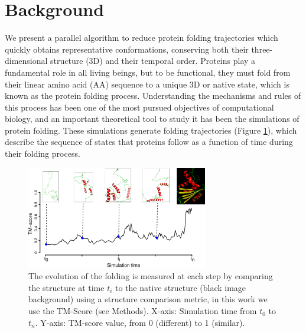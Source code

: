 \documentclass[american,twocolumn]{bmcart}
\begin{document}
\section*{Background}

We present a parallel algorithm to reduce protein folding trajectories which quickly obtains representative conformations, conserving both their three-dimensional structure (3D) and their temporal order. Proteins play a fundamental role in all living beings, but to be functional, they must fold from their linear amino acid (AA) sequence to a unique 3D or native state, which is known as the protein folding process. Understanding the mechanisms and rules of this process has been one of the most pursued objectives of computational biology, and an important theoretical tool to study it has been the simulations of protein folding. These simulations generate folding trajectories (Figure \ref{fig:Folding-Trajectory}), which describe the sequence of states that proteins follow as a function of time during their folding process.

\begin{figure}[th]
\includegraphics[bb=0bp 0bp 224bp 127bp]{images/trajectory-description-2RN2-pdbs}

\caption{ The evolution of the folding is measured at each step by comparing the structure at time $t_i$ to the native structure (black image background) using a structure comparison metric, in this work we use the TM-Score (see Methods). X-axis: Simulation time from $t_0$ to $t_n$. Y-axis: TM-score value, from 0 (different) to 1 (similar).\label{fig:Folding-Trajectory}}
\end{figure}
\end{document}
